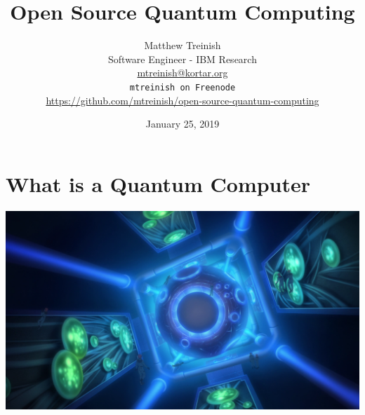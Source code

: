 \documentclass[aspectratio=169,11pt,hyperref={colorlinks=true}]{beamer}
\author[Matthew Treinish]{%
    \texorpdfstring{%
        \centering
        Matthew Treinish\\
        Software Engineer - IBM Research\\
        \href{mailto:mtreinish@kortar.org}{mtreinish@kortar.org}\\
        \texttt{mtreinish on Freenode}\\
        \href{https://github.com/mtreinish/open-source-quantum-computing}{https://github.com/mtreinish/open-source-quantum-computing}
   }
   {Matthew Treinish}
}
\date{January 25, 2019}
\title{Open Source Quantum Computing}
\begin{document}
\titlepage

\section{What is a Quantum Computer}
\begin{frame}
\end{frame}

\newcommand{\iu}{{i\mkern1mu}}

\begin{frame}
    \includegraphics[width=\textwidth]{Veda_AD2314.png}
\end{frame}
\end{document}
